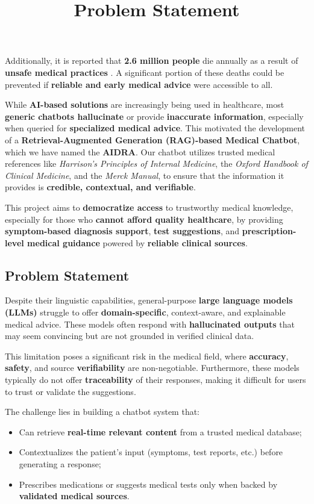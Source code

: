 \documentclass[12pt,a4paper]{report}
\newcommand{\titleKey}{AIDRA}
\begin{document}
Additionally, it is reported that \textbf{2.6 million people} die annually as a result of \textbf{unsafe medical practices} \cite{who_patientsafety}. A significant portion of these deaths could be prevented if \textbf{reliable and early medical advice} were accessible to all.

While \textbf{AI-based solutions} are increasingly being used in healthcare, most \textbf{generic chatbots hallucinate} or provide \textbf{inaccurate information}, especially when queried for \textbf{specialized medical advice}. This motivated the development of a \textbf{Retrieval-Augmented Generation (RAG)-based Medical Chatbot}, which we have named the \textbf{\titleKey}. Our chatbot utilizes trusted medical references like \textit{Harrison's Principles of Internal Medicine}, the \textit{Oxford Handbook of Clinical Medicine}, and the \textit{Merck Manual}, to ensure that the information it provides is \textbf{credible, contextual, and verifiable}.

This project aims to \textbf{democratize access} to trustworthy medical knowledge, especially for those who \textbf{cannot afford quality healthcare}, by providing \textbf{symptom-based diagnosis support}, \textbf{test suggestions}, and \textbf{prescription-level medical guidance} powered by \textbf{reliable clinical sources}.




\title{Problem Statement}
\subsection{Problem Statement}  
Despite their linguistic capabilities, general-purpose \textbf{large language models (LLMs)} struggle to offer \textbf{domain-specific}, context-aware, and explainable medical advice. These models often respond with \textbf{hallucinated outputs} that may seem convincing but are not grounded in verified clinical data.

This limitation poses a significant risk in the medical field, where \textbf{accuracy}, \textbf{safety}, and source \textbf{verifiability} are non-negotiable. Furthermore, these models typically do not offer \textbf{traceability} of their responses, making it difficult for users to trust or validate the suggestions.

The challenge lies in building a chatbot system that:
\begin{itemize}
  \item Can retrieve \textbf{real-time relevant content} from a trusted medical database;
  \item Contextualizes the patient’s input (symptoms, test reports, etc.) before generating a response;
  \item Prescribes medications or suggests medical tests only when backed by \textbf{validated medical sources}.
\end{itemize}
\end{document}
